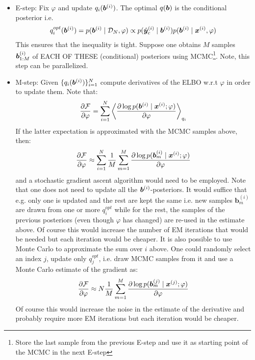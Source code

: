 \begin{itemize}
	\item E-step: Fix $\varphi$ and update $q_i(\boldsymbol{b}^{(i)})$. The optimal $q(\boldsymbol{b})$ is the conditional posterior i.e.   
	\begin{align}
		q_i^{opt}(\bm b^{(i)}) = p(\bm b^{(i)}\mid\mathcal{D}_N, \varphi) \propto p(\hat{\boldsymbol{y}}_c^{(i)} \mid \bm b^{(i)}) p(\bm b^{(i)} \mid \bm x^{(i)}, \varphi)
	\end{align}
	This ensures that the inequality is tight. Suppose one obtains $M$  samples $\boldsymbol{b}^{(i)}_{1:M}$ of EACH OF THESE (conditional) posteriors using MCMC\footnote{Store the last sample from the previous E-step and use it as starting point of the MCMC in the next E-step}. Note, this step can be parallelized. 
	\item M-step: Given $\{q_i(\boldsymbol{b}^{(i)})\}_{i=1}^N$ compute derivatives of the ELBO w.r.t $\varphi$ in order to update them. Note that:
	\begin{align}
	\frac{\partial \mathcal{F} }{\partial \varphi} = \sum_{i=1}^N \left< \frac{\partial \log p(\bm b^{(i)}\mid\bm{ x}^{(i)};\varphi)}{\partial \varphi} \right>_{q_i}
	\end{align}
	If the latter expectation is approximated with the MCMC samples above, then:
	\begin{align}
	\frac{\partial \mathcal{F}}{\partial \varphi}  \approx \sum_{i=1}^N \frac{1}{M} \sum_{m=1}^M  \frac{\partial \log p(\bm{b}_m^{(i)}\mid\bm x^{(i)};\varphi)}{\partial \varphi} 
	\end{align}
	and a stochastic gradient ascent algorithm would need to be employed.
	Note that one does not need to update all the $\boldsymbol{b}^{(i)}$-posteriors. It would suffice that e.g. only one is updated and the rest are kept the same \cite{neal1998view} i.e. new samples $\bm{b}_m^{(i)}$ are drawn from one or more $q_i^{opt}$ while for the rest, the samples of the previous posteriors (even though $\varphi$ has changed) are re-used in the estimate above. Of course this would increase the number of EM iterations that would be needed but each iteration would be cheaper.
	It is also possible to use Monte Carlo to approximate the sum over $i$ above. One could randomly select an index $j$, update only  $q_j^{opt}$, i.e. draw MCMC samples from it and use a Monte Carlo estimate of the gradient as:
	\begin{align}
	\frac{\partial \mathcal{F}}{\partial \varphi} \approx N  \frac{1}{M} \sum_{m=1}^M  \frac{\partial \log p(\bm{b}_m^{(j)}\mid\bm x^{(j)};\varphi)}{\partial \varphi} 
	\end{align}
	Of course this would increase the noise  in the estimate of the derivative and  probably require more EM iterations  but each iteration would be cheaper.












\end{itemize}
